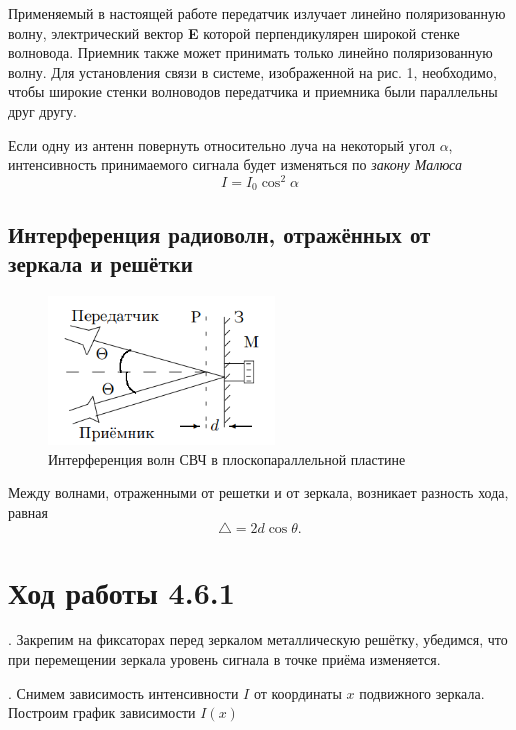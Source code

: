 \documentclass[a4paper,12pt]{article} %
\begin{document}
\noindent Применяемый в настоящей работе передатчик излучает линейно поляризованную волну, электрический вектор \textbf{E} которой перпендикулярен широкой стенке волновода. Приемник также может принимать только линейно поляризованную волну. Для установления связи в системе, изображенной на рис. 1, необходимо, чтобы широкие стенки волноводов передатчика и приемника были параллельны друг другу.

\medskip 

\noindent Если одну из антенн повернуть относительно луча на некоторый угол $\alpha$, интенсивность принимаемого сигнала будет изменяться по \textit{закону Малюса}
\begin{equation}
    I = I_0 \cos^2 \alpha
\end{equation}

\subsection{Интерференция радиоволн, отражённых от зеркала и решётки}

\begin{figure}[h]
    \centering
    \includegraphics[width=6cm]{fig2.PNG}
    \caption{Интерференция волн СВЧ в плоскопараллельной пластине}
    \label{fig:vac}
\end{figure}

\noindent Между волнами, отраженными от решетки и от зеркала, возникает разность хода, равная
\begin{equation}
    \triangle = 2 d \cos \theta.
\end{equation}


\section{Ход работы 4.6.1}

. Закрепим на фиксаторах перед зеркалом металлическую решётку, убедимся, что при перемещении зеркала уровень сигнала в точке приёма изменяется.

\medskip

. Снимем зависимость интенсивности $I$ от координаты $x$ подвижного зеркала. Построим график зависимости $I(x)$
    
\end{document}
